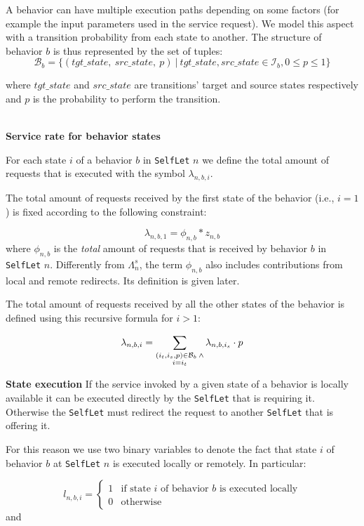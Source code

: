 \documentclass[11pt]{amsart}
\newcommand{\slet}{\texttt{SelfLet}}
\begin{document}
A behavior can have multiple execution paths depending on some factors (for example the input parameters used in the service request). We model this aspect with a transition probability from each state to another. The structure of behavior $b$ is thus represented by the set of tuples:
$$
\mathcal{B}_b = \{ (tgt\_state,\: src\_state,\: p) \: | \: tgt\_state,src\_state  \in \mathcal{I}_b, 0 \leq p \leq 1\}
$$ 

where $tgt\_state$ and $src\_state$ are transitions' target and source states respectively and $p$ is the probability to perform the transition.

\\

{\bf Service rate for behavior states}

For each state $i$ of a behavior $b$ in \slet{} $n$ we define the total amount of requests that is executed with the symbol $\lambda_{n,b,i}$. 

The total amount of requests received by the first state of the behavior (i.e., $i=1$) is fixed according to the following constraint:


$$
	 \lambda_{n,b,1} = \phi_{n,b} * z_{n,b}
$$
where $\phi_{n,b}$ is the \emph{total} amount of requests that is received by behavior $b$ in \slet{} $n$. Differently from $\Lambda_{n}^{s}$, the term $\phi_{n,b}$ also includes contributions from local and remote redirects. Its definition is given later.


The total amount of requests received by all the other states of the behavior is defined using this recursive formula for $i > 1$:

$$
	 \lambda_{n,b,i} = \sum_{\begin{subarray}{c} (i_t, i_s, p) \in \mathcal{B}_b \: \wedge \\ i=i_t \end{subarray}} \lambda_{n, b, i_s} \cdot p
$$


{\bf State execution}
If the service invoked by a given state of a behavior is locally available it can be executed directly by the \slet{} that is requiring it. Otherwise the \slet{} must redirect the request to another \slet{} that is offering it. 

For this reason we use two binary variables to denote the fact that state $i$ of behavior $b$ at \slet{} $n$ is executed locally or remotely. In particular:

$$
l_{n, b, i} = \left\{ 
	\begin{array}{rl}
	1 & \mbox{if state $i$ of behavior $b$ is executed locally} \\
	0 & \mbox{otherwise} 
	\end{array} \right.
$$
 and
 
\end{document}
